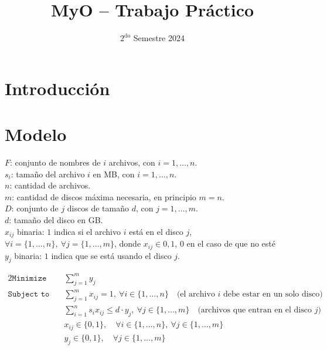 \documentclass[11pt, a4paper, pdftex]{article}
\title{
	\huge MyO -- Trabajo Práctico\\
}
\author{
	\Mati \and \Xime \and \Lucifer \and \Lu
}
\date{\small $\text{2}^{\text{do}}$ Semestre 2024
}
\begin{document}
\renewcommand{\contentsname}{Contenidos}
\renewcommand{\listfigurename}{Listado de Figuras}
\renewcommand{\listtablename}{Listado de Tablas}
\renewcommand{\tablename}{Tabla}

\newcommand{\minimize}{\texttt{Minimize}\quad\,\,}
\newcommand{\maximize}{\texttt{Maximize}\quad\,\,}
\newcommand{\subjto}{\texttt{Subject to}\quad}

\maketitle

\section*{Introducción}

\section*{Modelo}

$F$: conjunto de nombres de $i$ archivos, con $i = 1, \ldots, n$. \\

$s_{i}$: tamaño del archivo $i$ en MB, con $i = 1, \ldots, n$. \\

$n$: cantidad de archivos. \\

$m$: cantidad de discos máxima necesaria, en principio $m = n$. \\

$D$: conjunto de $j$ discos de tamaño $d$, con $j = 1, \ldots, m$. \\

$d$: tamaño del disco en GB. \\ 

$x_{ij}$ binaria: $1$ indica si el archivo $i$ está en el disco $j$, $\forall i = \{1, \ldots, n\},\ \forall j = \{1, \ldots, m\}$, donde $x_{ij} \in {0, 1}$, $0$ en el caso de que no esté\\

$y_{j}$ binaria: $1$ indica que se está usando el disco $j$.

\begin{alignat*}{2}
	\minimize
	& \sum_{j = 1}^{m} y_{j}\\
	\subjto
	& \sum_{j = 1}^{m} x_{ij} = 1, \ \forall i \in \{1, \ldots, n\} \quad\text{(el archivo $i$ debe estar en un solo disco)}\\
	& \sum_{i = 1}^{n} s_{i} x_{ij} \le d\cdot y_{j}, \ \forall j \in \{1, \ldots, m\} \quad\text{(archivos que entran en el disco $j$)}\\
	& x_{ij} \in \{0,1\}, \quad \forall i \in \{1, \ldots, n\}, \ \forall j \in \{1, \ldots, m\}\\
	& y_{j} \in \{0,1\}, \quad \forall j \in \{1, \ldots, m\}
\end{alignat*}
\end{document}
